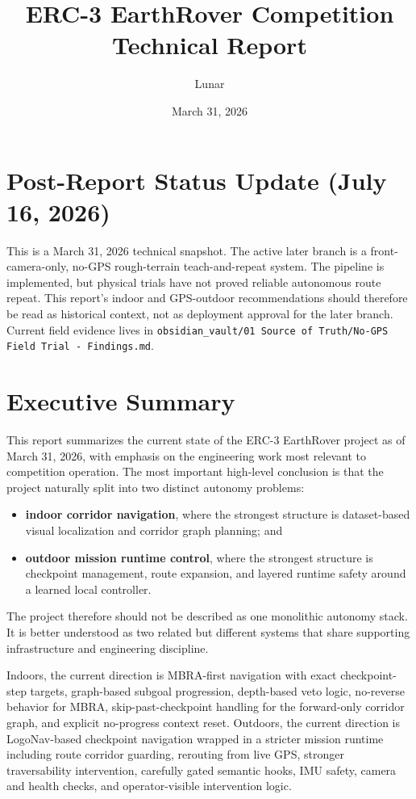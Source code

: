 \documentclass[11pt]{article}
\title{ERC-3 EarthRover Competition Technical Report}
\author{Lunar}
\date{March 31, 2026}
\begin{document}
\maketitle
\tableofcontents
\newpage

\section*{Post-Report Status Update (July 16, 2026)}
This is a March 31, 2026 technical snapshot. The active later branch is a
front-camera-only, no-GPS rough-terrain teach-and-repeat system. The pipeline is
implemented, but physical trials have not proved reliable autonomous route
repeat. This report's indoor and GPS-outdoor recommendations should therefore
be read as historical context, not as deployment approval for the later branch.
Current field evidence lives in
\texttt{obsidian\_vault/01 Source of Truth/No-GPS Field Trial - Findings.md}.

\section{Executive Summary}
This report summarizes the current state of the ERC-3 EarthRover project as of March 31, 2026, with emphasis on the engineering work most relevant to competition operation. The most important high-level conclusion is that the project naturally split into two distinct autonomy problems:
\begin{itemize}[leftmargin=*]
  \item \textbf{indoor corridor navigation}, where the strongest structure is dataset-based visual localization and corridor graph planning; and
  \item \textbf{outdoor mission runtime control}, where the strongest structure is checkpoint management, route expansion, and layered runtime safety around a learned local controller.
\end{itemize}

The project therefore should not be described as one monolithic autonomy stack. It is better understood as two related but different systems that share supporting infrastructure and engineering discipline.

Indoors, the current direction is MBRA-first navigation with exact checkpoint-step targets, graph-based subgoal progression, depth-based veto logic, no-reverse behavior for MBRA, skip-past-checkpoint handling for the forward-only corridor graph, and explicit no-progress context reset. Outdoors, the current direction is LogoNav-based checkpoint navigation wrapped in a stricter mission runtime including route corridor guarding, rerouting from live GPS, stronger traversability intervention, carefully gated semantic hooks, IMU safety, camera and health checks, and operator-visible intervention logic.
\end{document}
